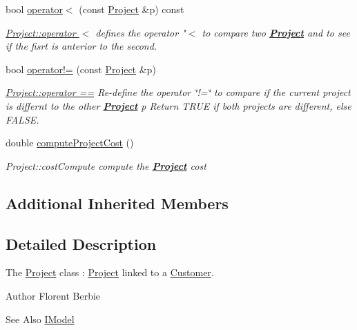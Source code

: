 \begin{DoxyCompactItemize}
bool \hyperlink{classModels_1_1Project_a8e7cc264d433c708323faccae7bdd082}{operator$<$} (const \hyperlink{classModels_1_1Project}{Project} \&p) const 
\begin{DoxyCompactList}\small\item\em \hyperlink{classModels_1_1Project_a8e7cc264d433c708323faccae7bdd082}{Project\-::operator $<$} defines the operator "$<$ to compare two {\bfseries \hyperlink{classModels_1_1Project}{Project}} and to see if the fisrt is anterior to the second. \end{DoxyCompactList}\item 
bool \hyperlink{classModels_1_1Project_adf5947680a4eca62cd1cbda58a2a62f0}{operator!=} (const \hyperlink{classModels_1_1Project}{Project} \&p)
\begin{DoxyCompactList}\small\item\em \hyperlink{classModels_1_1Project_a2f322e63f6b42273c24093b9df46c2d6}{Project\-::operator ==} Re-\/define the operator \char`\"{}!=\char`\"{} to compare if the current project is differnt to the other {\bfseries \hyperlink{classModels_1_1Project}{Project}} {\itshape p} Return T\-R\-U\-E if both projects are different, else F\-A\-L\-S\-E. \end{DoxyCompactList}\item 
double \hyperlink{classModels_1_1Project_ad03d0e009482299641f198935826e7c5}{compute\-Project\-Cost} ()
\begin{DoxyCompactList}\small\item\em Project\-::cost\-Compute compute the {\bfseries \hyperlink{classModels_1_1Project}{Project}} {\itshape cost} \end{DoxyCompactList}\end{DoxyCompactItemize}
\subsection*{Additional Inherited Members}


\subsection{Detailed Description}
The \hyperlink{classModels_1_1Project}{Project} class \-: \hyperlink{classModels_1_1Project}{Project} linked to a \hyperlink{classModels_1_1Customer}{Customer}. 

\begin{DoxyAuthor}{Author}
Florent Berbie 
\end{DoxyAuthor}
\begin{DoxySeeAlso}{See Also}
\hyperlink{classModels_1_1IModel}{I\-Model} 
\end{DoxySeeAlso}


